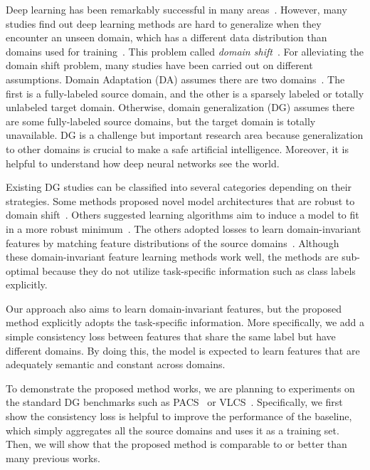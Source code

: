 Deep learning has been remarkably successful in many areas~\cite{}. However, many studies find out deep learning methods are hard to generalize when they encounter an unseen domain, which has a different data distribution than domains used for training~\cite{}. This problem called \textit{domain shift}~\cite{}. For alleviating the domain shift problem, many studies have been carried out on different assumptions. Domain Adaptation (DA) assumes there are two domains~\cite{}. The first is a fully-labeled source domain, and the other is a sparsely labeled or totally unlabeled target domain. Otherwise, domain generalization (DG) assumes there are some fully-labeled source domains, but the target domain is totally unavailable. DG is a challenge but important research area because generalization to other domains is crucial to make a safe artificial intelligence. Moreover, it is helpful to understand how deep neural networks see the world.

Existing DG studies can be classified into several categories depending on their strategies. Some methods proposed novel model architectures that are robust to domain shift~\cite{}. Others suggested learning algorithms aim to induce a model to fit in a more robust minimum~\cite{}. The others adopted losses to learn domain-invariant features by matching feature distributions of the source domains~\cite{}. Although these domain-invariant feature learning methods work well, the methods are sub-optimal because they do not utilize task-specific information such as class labels explicitly. 

Our approach also aims to learn domain-invariant features, but the proposed method explicitly adopts the task-specific information. More specifically, we add a simple consistency loss between features that share the same label but have different domains. By doing this, the model is expected to learn features that are adequately semantic and constant across domains. 

To demonstrate the proposed method works, we are planning to experiments on the standard DG benchmarks such as PACS~\cite{} or VLCS~\cite{}. Specifically, we first show the consistency loss is helpful to improve the performance of the baseline, which simply aggregates all the source domains and uses it as a training set. Then, we will show that the proposed method is comparable to or better than many previous works.


